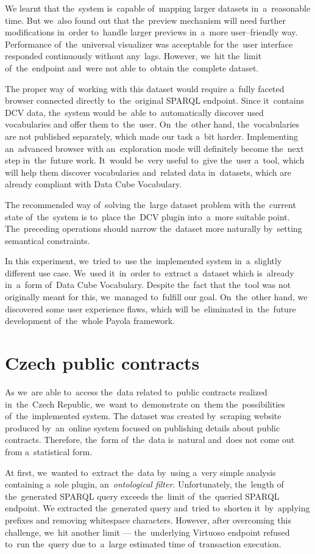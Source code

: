 We learnt that the~system is~capable of~mapping larger datasets in~a~reasonable 
time. But we~also found out that the~preview mechanism will need further 
modifications in~order to~handle larger previews in~a~more user--friendly way. 
Performance of~the~universal visualizer was acceptable for the~user interface 
responded continuously without any~lags. However, we~hit the~limit of~the~endpoint and~were not able to~obtain the~complete dataset. 

The proper way of~working with this dataset would require a~fully faceted 
browser connected directly to~the~original SPARQL endpoint. Since it~contains 
DCV data, the~system would be~able to~automatically discover used vocabularies 
and offer them to~the~user. On~the~other hand, the~vocabularies are not published
separately, which made our task a~bit harder. Implementing an~advanced browser
with an~exploration mode will definitely become the~next step in~the~future work. It~would be~very useful to~give the~user a~tool, which will help them 
discover vocabularies and~related data in~datasets, which are already compliant 
with Data Cube Vocabulary.

The recommended way of~solving the~large dataset problem with the~current state of~the~system
is to~place the~DCV 
plugin into~a~more suitable point. The~preceding operations should narrow the~dataset more naturally by~setting semantical constraints.

In this experiment, we~tried to~use the~implemented system in~a~slightly 
different use case. We~used it~in~order to~extract a~dataset which is~already in~a~form of~Data Cube Vocabulary. Despite the~fact that the~tool was not 
originally meant for this, we~managed to~fulfill our goal. On~the~other hand, 
we discovered some user experience flaws, which will be~eliminated in~the~future 
development of~the~whole Payola framework.

\section{Czech public contracts}
As we~are able to~access the~data related to~public contracts realized in~the~Czech Republic, we~want to~demonstrate on~them the~possibilities of~the~implemented system.
The dataset was created by~scraping website produced by~an~online system focused 
on publishing details about public contracts. Therefore, the~form of~the~data is~natural and~does not come out from a~statistical form.

At first, we~wanted to~extract the~data by~using a~very simple analysis
containing a~sole plugin, an~\emph{ontological filter}. Unfortunately, the~length
of the~generated SPARQL query exceeds the~limit of~the~queried SPARQL endpoint.
We extracted the~generated query and~tried to~shorten it~by~applying prefixes 
and removing whitespace characters. However, after overcoming this challenge, we~hit another limit --- the~underlying Virtuoso endpoint refused to~run the~query 
due to~a~large estimated time of~transaction execution.

